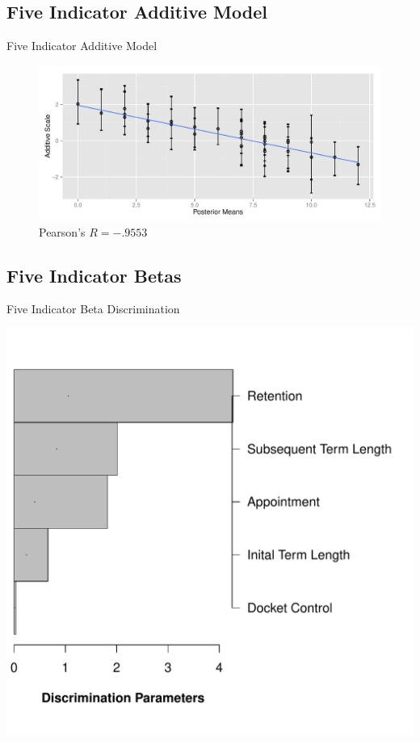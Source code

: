 \documentclass[compress]{beamer}
\begin{document}
\subsection{Five Indicator Additive Model}
\begin{frame}{Five Indicator Additive Model}	
\begin{figure}\centering
\includegraphics[scale=.5]{graphics/fiveind/fiveind_additive_ggplot}
\caption{Pearson's $R=-.9553$ }
\end{figure}
\end{frame}
\subsection{Five Indicator Betas}
\begin{frame}{Five Indicator Beta Discrimination}	
\begin{center}
\includegraphics[scale=.5]{graphics/fiveind/FiveBetaDiscrimination}
\end{center}
\end{frame}
\end{document}

